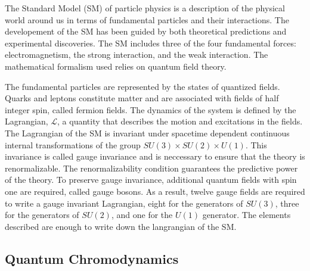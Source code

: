 The Standard Model (SM) of particle physics is a description of the physical world around us in terms of fundamental particles 
and their interactions. 
The developement of the SM has been guided by both theoretical predictions and experimental discoveries.
The SM includes three of the four fundamental forces: electromagnetism, the strong interaction, and the weak interaction.
The mathematical formalism used relies on quantum field theory. %

The fundamental particles are represented by the states of quantized fields.
Quarks and leptons constitute matter and are associated with fields of half integer spin, called fermion fields.
The dynamics of the system is defined by the Lagrangian, $\mathcal{L}$, a quantity that describes the motion and excitations 
in the fields.
The Lagrangian of the SM is invariant under spacetime dependent continuous internal transformations of the group 
$ SU\left(3\right) \times SU\left(2\right) \times U\left(1\right) $.
This invariance is called gauge invariance and is neccessary to ensure that the theory is renormalizable.
The renormalizability condition guarantees the predictive power of the theory.
To preserve gauge invariance, additional quantum fields with spin one are required, called gauge bosons.
As a result, twelve gauge fields are required to write a gauge invariant Lagrangian, 
 eight for the generators of $ SU\left(3\right) $, three for the generators of $SU\left(2\right)$, 
and one for the $U\left(1\right)$ generator.
The elements described are enough to write down the langrangian of the SM.

\subsection{Quantum Chromodynamics}

